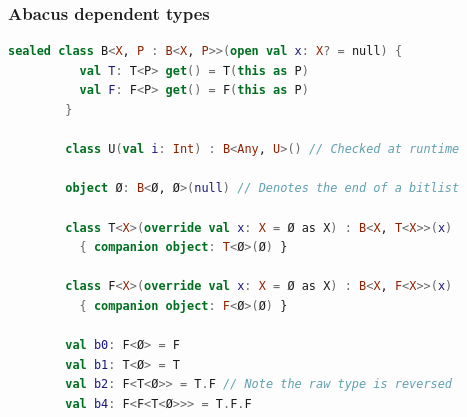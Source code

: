\documentclass{beamer}
\begin{document}
\begin{frame}
    \end{frame}

    \begin{frame}[fragile]
        \frametitle{Abacus dependent types}
        \begin{lstlisting}[language=Kotlin, gobble=7]
        sealed class B<X, P : B<X, P>>(open val x: X? = null) {
          val T: T<P> get() = T(this as P)
          val F: F<P> get() = F(this as P)
        }

        class U(val i: Int) : B<Any, U>() // Checked at runtime

        object Ø: B<Ø, Ø>(null) // Denotes the end of a bitlist

        class T<X>(override val x: X = Ø as X) : B<X, T<X>>(x)
          { companion object: T<Ø>(Ø) }

        class F<X>(override val x: X = Ø as X) : B<X, F<X>>(x)
          { companion object: F<Ø>(Ø) }

        val b0: F<Ø> = F
        val b1: T<Ø> = T
        val b2: F<T<Ø>> = T.F // Note the raw type is reversed
        val b4: F<F<T<Ø>>> = T.F.F
        \end{lstlisting}
    \end{frame}
\end{document}
